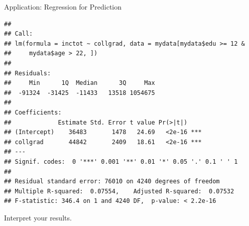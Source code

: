 \documentclass[
  ignorenonframetext,
]{beamer}
\newenvironment{Shaded}{\begin{snugshade}}{\end{snugshade}}
\newcommand{\DecValTok}[1]{\textcolor[rgb]{0.00,0.00,0.81}{#1}}
\newcommand{\FunctionTok}[1]{\textcolor[rgb]{0.00,0.00,0.00}{#1}}
\newcommand{\NormalTok}[1]{#1}
\newcommand{\OtherTok}[1]{\textcolor[rgb]{0.56,0.35,0.01}{#1}}
\newcommand{\SpecialCharTok}[1]{\textcolor[rgb]{0.00,0.00,0.00}{#1}}
\begin{document}
\begin{frame}[fragile]{Application: Regression for Prediction}
\protect\hypertarget{application-regression-for-prediction-7}{}
\tiny

\begin{Shaded}
\end{Shaded}

\begin{verbatim}
## 
## Call:
## lm(formula = inctot ~ collgrad, data = mydata[mydata$edu >= 12 & 
##     mydata$age > 22, ])
## 
## Residuals:
##     Min      1Q  Median      3Q     Max 
##  -91324  -31425  -11433   13518 1054675 
## 
## Coefficients:
##             Estimate Std. Error t value Pr(>|t|)    
## (Intercept)    36483       1478   24.69   <2e-16 ***
## collgrad       44842       2409   18.61   <2e-16 ***
## ---
## Signif. codes:  0 '***' 0.001 '**' 0.01 '*' 0.05 '.' 0.1 ' ' 1
## 
## Residual standard error: 76010 on 4240 degrees of freedom
## Multiple R-squared:  0.07554,    Adjusted R-squared:  0.07532 
## F-statistic: 346.4 on 1 and 4240 DF,  p-value: < 2.2e-16
\end{verbatim}

\normalsize

Interpret your results.
\end{frame}
\end{document}
